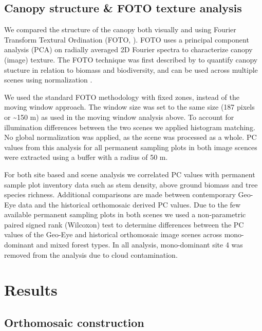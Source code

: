 \documentclass[remote sensing,article,submit,moreauthors,pdftex]{mdpi}
\begin{document}
\hypertarget{canopy-structure-foto-texture-analysis}{%
\subsection{Canopy structure \& FOTO texture
analysis}\label{canopy-structure-foto-texture-analysis}}

We compared the structure of the canopy both visually and using Fourier
Transform Textural Ordination (FOTO, \citet{couteron2002}). FOTO uses a
principal component analysis (PCA) on radially averaged 2D Fourier
spectra to characterize canopy (image) texture. The FOTO technique was
first described by \citet{couteron2002} to quantify canopy stucture in
relation to biomass and biodiversity, and can be used across multiple
scenes using normalization \citep{Barbier2010}.

We used the standard FOTO methodology with fixed zones, instead of the
moving window approach. The window size was set to the same size (187
pixels or \textasciitilde{}150 m) as used in the moving window analysis
above. To account for illumination differences between the two scenes we
applied histogram matching. No global normalization was applied, as the
scene was processed as a whole. PC values from this analysis for all
permanent sampling plots in both image scences were extracted using a
buffer with a radius of 50 m.

For both site based and scene analysis we correlated PC values with
permanent sample plot inventory data such as stem density, above ground
biomass and tree species richness. Additional comparisons are made
between contemporary Geo-Eye data and the historical orthomosaic derived
PC values. Due to the few available permanent sampling plots in both
scenes we used a non-parametric paired signed rank (Wilcoxon) test
\citep{wilcoxon1945} to determine differences between the PC values of
the Geo-Eye and historical orthomosaic image scenes across mono-dominant
and mixed forest types. In all analysis, mono-dominant site 4 was
removed from the analysis due to cloud contamination.

\hypertarget{results}{%
\section{Results}\label{results}}

\hypertarget{orthomosaic-construction}{%
\subsection{Orthomosaic construction}\label{orthomosaic-construction}}
\end{document}
